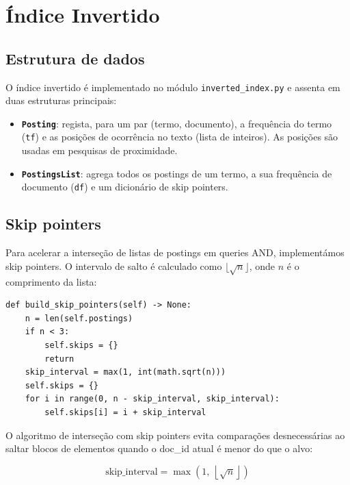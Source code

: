 \documentclass[12pt,a4paper]{article}
\begin{document}
\section{Índice Invertido}

\subsection{Estrutura de dados}

O índice invertido é implementado no módulo \texttt{inverted\_index.py} e assenta em duas estruturas principais:

\begin{itemize}
    \item \textbf{\texttt{Posting}}: regista, para um par (termo, documento), a frequência do termo (\texttt{tf}) e as posições de ocorrência no texto (lista de inteiros). As posições são usadas em pesquisas de proximidade.
    \item \textbf{\texttt{PostingsList}}: agrega todos os postings de um termo, a sua frequência de documento (\texttt{df}) e um dicionário de skip pointers.
\end{itemize}

\subsection{Skip pointers}

Para acelerar a interseção de listas de postings em queries AND, implementámos skip pointers. O intervalo de salto é calculado como $\lfloor\sqrt{n}\rfloor$, onde $n$ é o comprimento da lista:

\begin{lstlisting}[caption={Cálculo dos skip pointers}]
def build_skip_pointers(self) -> None:
    n = len(self.postings)
    if n < 3:
        self.skips = {}
        return
    skip_interval = max(1, int(math.sqrt(n)))
    self.skips = {}
    for i in range(0, n - skip_interval, skip_interval):
        self.skips[i] = i + skip_interval
\end{lstlisting}

O algoritmo de interseção com skip pointers evita comparações desnecessárias ao saltar blocos de elementos quando o doc\_id atual é menor do que o alvo:

\begin{equation}
    \text{skip\_interval} = \max\!\left(1,\ \left\lfloor\sqrt{n}\right\rfloor\right)
\end{equation}
\end{document}
